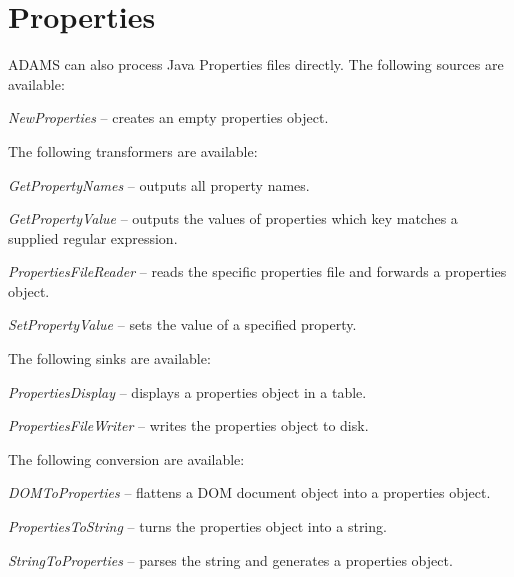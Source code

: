 \section{Properties}
\label{properties}
ADAMS can also process Java Properties files directly.
The following sources are available:
\begin{tight_itemize}
	\item \textit{NewProperties} -- creates an empty properties object.
\end{tight_itemize}
The following transformers are available:
\begin{tight_itemize}
	\item \textit{GetPropertyNames} -- outputs all property names.
	\item \textit{GetPropertyValue} -- outputs the values of properties
	which key matches a supplied regular expression.
	\item \textit{PropertiesFileReader} -- reads the specific properties file 
	and forwards a properties object.
	\item \textit{SetPropertyValue} -- sets the value of a specified property.
\end{tight_itemize}
The following sinks are available:
\begin{tight_itemize}
	\item \textit{PropertiesDisplay} -- displays a properties object in a table.
	\item \textit{PropertiesFileWriter} -- writes the properties object to disk.
\end{tight_itemize}
The following conversion are available:
\begin{tight_itemize}
	\item \textit{DOMToProperties} -- flattens a DOM document object into a 
	properties object.
	\item \textit{PropertiesToString} -- turns the properties object into a string.
	\item \textit{StringToProperties} -- parses the string and generates a properties object.
\end{tight_itemize}

\newpage
